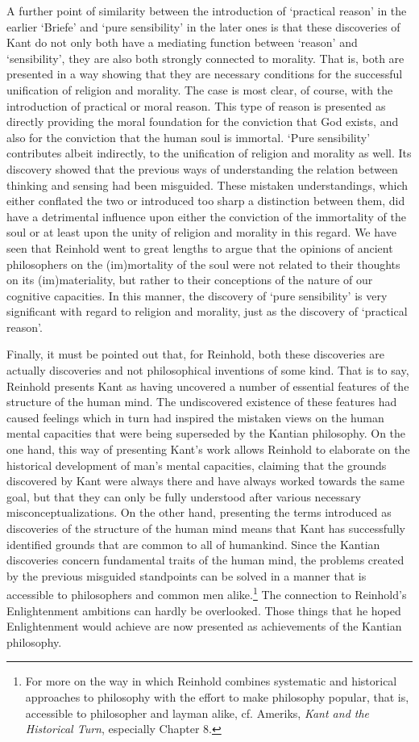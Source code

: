  A further point of similarity between the introduction of `practical reason' in the earlier `Briefe' and `pure sensibility' in the later ones is that these discoveries of Kant do not only both have a mediating function between `reason' and `sensibility', they are also both strongly connected to morality. That is, both are presented in a way showing that they are necessary conditions for the successful unification of religion and morality. The case is most clear, of course, with the introduction of practical or moral reason. This type of reason is presented as directly providing the moral foundation for the conviction that God exists, and also for the conviction that the human soul is immortal. `Pure sensibility' contributes albeit indirectly, to the unification of religion and morality as well. Its discovery showed that the previous ways of understanding the relation between thinking and sensing had been misguided. These mistaken understandings, which either conflated the two or introduced too sharp a distinction between them, did have a detrimental influence upon either the conviction of the immortality of the soul or at least upon the unity of religion and morality in this regard. We have seen that Reinhold went to great lengths to argue that the opinions of ancient philosophers on the (im)mortality of the soul were not related to their thoughts on its (im)materiality, but rather to their conceptions of the nature of our cognitive capacities. In this manner, the discovery of `pure sensibility' is very significant with regard to religion and morality, just as the discovery of `practical reason'.

 Finally, it must be pointed out that, for Reinhold, both these discoveries are actually discoveries and not philosophical inventions of some kind. That is to say, Reinhold presents Kant as having uncovered a number of essential features of the structure of the human mind. The undiscovered existence of these features had caused feelings which in turn had inspired the mistaken views on the human mental capacities that were being superseded by the Kantian philosophy. On the one hand, this way of presenting Kant's work allows Reinhold to elaborate on the historical development of man's mental capacities, claiming that the grounds discovered by Kant were always there and have always worked towards the same goal, but that they can only be fully understood after various necessary misconceptualizations. On the other hand, presenting the terms introduced as discoveries of the structure of the human mind means that Kant has successfully identified grounds that are common to all of humankind. Since the Kantian discoveries concern fundamental traits of the human mind, the problems created by the previous misguided standpoints can be solved in a manner that is accessible to philosophers and common men alike.\footnote{ For more on the way in which Reinhold combines systematic and historical approaches to philosophy with the effort to make philosophy popular, that is, accessible to philosopher and layman alike, cf. Ameriks, \textit{Kant and the Historical Turn}, especially Chapter 8. } The connection to Reinhold's Enlightenment ambitions can hardly be overlooked. Those things that he hoped Enlightenment would achieve are now presented as achievements of the Kantian philosophy. 

